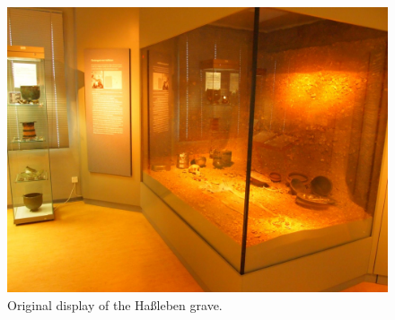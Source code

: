 \begin{figure}[H] %
	\centering
	\includegraphics[width=1.0\textwidth]{../pics/Original.png}
	\caption{Original display of the Haßleben grave.}
	\label{fig:museums_original}
\end{figure}

